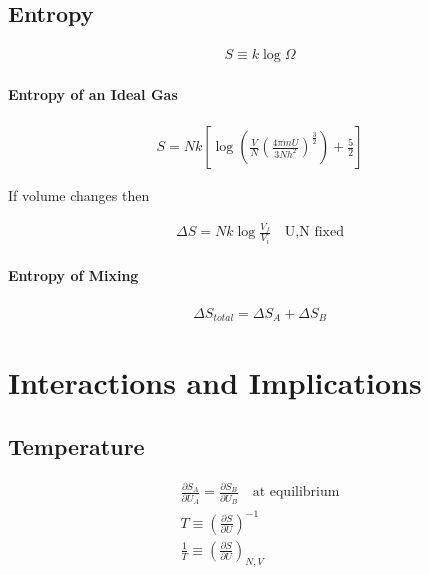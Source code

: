 \documentclass[12pt]{article}
\begin{document}
\subsection{Entropy}%
\label{sub:entropy}

\begin{align}
S\equiv k\log\Omega
\end{align}

\paragraph{Entropy of an Ideal Gas}%
\label{par:entropy_of_an_ideal_gas}

\begin{align}
  S=Nk\left[\log\left(\frac{V}{N}\left(\frac{4\pi
  mU}{3Nh^2}\right)^{\frac{3}{2}}\right)+\frac{5}{2}\right]
\end{align}

If volume changes then

\begin{align}
  \Delta S=Nk\log\frac{V_f}{V_i}\quad\text{U,N fixed}
\end{align}

\paragraph{Entropy of Mixing}%
\label{par:entropy_of_mixing}

\begin{align}
  \Delta S_{total}=\Delta S_{A}+\Delta S_{B}
\end{align}

\section{Interactions and Implications}%
\label{sec:interactions_and_implications}

\subsection{Temperature}%
\label{sub:temperature}

\begin{align}
  \frac{\partial S_A}{\partial U_A}=\frac{\partial S_B}{\partial U_B}\quad
  \text{at equilibrium}\\
  T\equiv \left(\frac{\partial S}{\partial U}\right)^{-1}\\
  \frac{1}{T} \equiv\left(\frac{\partial S}{\partial U}\right)_{N,V}
\end{align}
\end{document}
